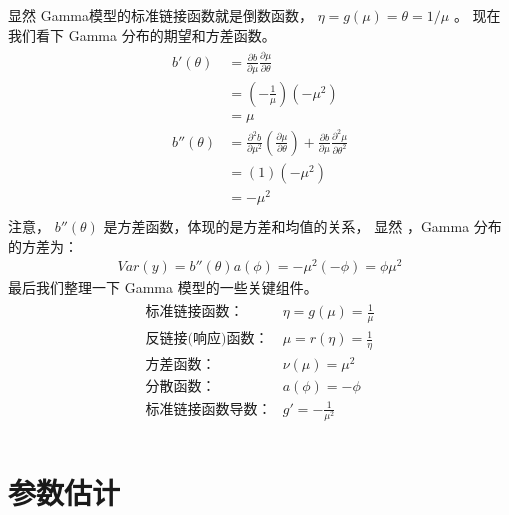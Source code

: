 \documentclass[letterpaper,10pt,english]{sphinxmanual}
\begin{document}
显然 Gamma模型的标准链接函数就是倒数函数， \(\eta=g(\mu) = \theta= 1/\mu\) 。
现在我们看下 Gamma 分布的期望和方差函数。
\begin{align}\label{equation:gamma模型/content:gamma模型/content:9}\!\begin{aligned}
b'(\theta) &= \frac{\partial b}{\partial \mu} \frac{\partial \mu}{\partial \theta}\\
&= \left ( - \frac{1}{\mu} \right )(-\mu^2)\\
&=\mu\\
b''(\theta) &= \frac{\partial^2 b}{\partial \mu^2} \left ( \frac{\partial \mu}{\partial \theta} \right )
+ \frac{\partial b}{\partial \mu} \frac{\partial^2\mu}{\partial \theta^2}\\
&= (1)(-\mu^2)\\
&= -\mu^2\\
\end{aligned}\end{align}
注意， \(b''(\theta)\) 是方差函数，体现的是方差和均值的关系，
显然  ，Gamma 分布的方差为：
\begin{equation}\label{equation:gamma模型/content:gamma模型/content:10}
\begin{split}Var(y) = b''(\theta) a(\phi) = -\mu^2(-\phi) = \phi\mu^2\end{split}
\end{equation}
最后我们整理一下 Gamma 模型的一些关键组件。
\begin{align}\label{equation:gamma模型/content:gamma模型/content:11}\!\begin{aligned}
\text{标准链接函数：}  & \eta = g(\mu) = \frac{1}{\mu}\\
\text{反链接(响应)函数：}  & \mu = r(\eta) = \frac{1}{\eta}\\
\text{方差函数：}  & \nu(\mu)=\mu^2\\
\text{分散函数：}  & a(\phi) = -\phi\\
\text{标准链接函数导数：} & g'=-\frac{1}{\mu^2}\\
\end{aligned}\end{align}

\section{参数估计}
\label{\detokenize{gamma_u6a21_u578b/content:id4}}
\end{document}
